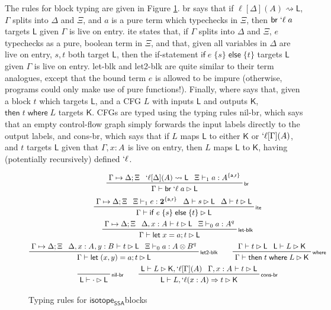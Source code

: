 \documentclass[acmsmall,screen,review]{acmart}
\newcommand{\mb}[1]{\ensuremath{\mathbf{#1}}}
\newcommand{\ms}[1]{\ensuremath{\mathsf{#1}}}
\newcommand{\lbl}[1]{{`#1}}
\newcommand{\lto}{\Rightarrow}
\newcommand{\letstmt}[3]{\ensuremath{\ms{let}\;#1 = #2; #3}}
\newcommand{\brb}[2]{\ms{br}\;#1\;#2}
\newcommand{\lbrb}[2]{\brb{\lbl{#1}}{#2}}
\newcommand{\ite}[3]{\ms{if}\;#1\;\{#2\}\;\ms{else}\;\{#3\}}
\newcommand{\ewhere}[2]{\ms{then}\;#1\;\ms{where}\;#2}
\newcommand{\wbranch}[3]{#1(#2) \lto #3}
\newcommand{\lwbranch}[3]{\wbranch{\lbl{#1}}{#2}{#3}}
\newcommand{\csplits}[3]{#1 \mapsto #2;#3}
\newcommand{\lwk}[2]{#1 \rightsquigarrow #2}
\newcommand{\thyp}[3]{#1: {#2}^{#3}}
\newcommand{\lhyp}[3]{#1[#2](#3)}
\newcommand{\llhyp}[3]{\lhyp{\lbl{#1}}{#2}{#3}}
\newcommand{\rle}[1]{{\scriptsize\textsf{#1}}}
\newcommand{\tint}{{\{\ms{a}, \ms{r}\}}}
\newcommand{\hasty}[5]{#1 \vdash_{#2} #3: {#4}^{#5}}
\newcommand{\haslb}[3]{#1 \vdash #2 \rhd #3}
\newcommand{\lhaslb}[3]{#1 \vdash #2 \rhd #3}
\newcommand{\isotopessa}{\ms{isotope_{SSA}}}
\begin{document}
The rules for block typing are given in Figure \ref{fig:ssa-block-typing}.
\rle{br} says that if \(\lwk{\lhyp{\ell}{\Delta}{A}}{\ms{L}}\), \(\Gamma\)
splits into \(\Delta\) and \(\Xi\), and \(a\) is a pure term which typechecks in
\(\Xi\), then \(\lbrb{\ell}{a}\) targets \(\ms{L}\) given \(\Gamma\) is live on
entry. \rle{ite} states that, if \(\Gamma\) splits into \(\Delta\) and \(\Xi\),
\(e\) typechecks as a pure, boolean term in \(\Xi\), and that, given all
variables in \(\Delta\) are live on entry, \(s, t\) both target \(\ms{L}\), then
the if-statement \(\ite{e}{s}{t}\) targets \(\ms{L}\) given \(\Gamma\) is live
on entry. \rle{let-blk} and \rle{let2-blk} are quite similar to their term
analogues, except that the bound term \(e\) is allowed to be impure (otherwise,
programs could only make use of pure functions!). Finally, \rle{where} says
that, given a block \(t\) which targets \(\ms{L}\), and a CFG \(L\) with inputs
\(\ms{L}\) and outputs \(\ms{K}\), \(\ewhere{t}{L}\) targets \(\ms{K}\). CFGs
are typed using the typing rules \rle{nil-br}, which says that an empty
control-flow graph simply forwards the input labels directly to the output
labels, and \rle{cons-br}, which says that if \(L\) maps \(\ms{L}\) to either
\(\ms{K}\) or \(\lbl{\ell}[\Gamma](A)\), and \(t\) targets \(\ms{L}\) given that
\(\Gamma, \thyp{x}{A}{}\) is live on entry, then \(L\) maps \(\ms{L}\) to
\(\ms{K}\), having (potentially recursively) defined \(\lbl{\ell}\).

\begin{figure}
  \begin{gather*}    
    \prftree[r]{\rle{br}}
      {\csplits{\Gamma}{\Delta}{\Xi}}
      {\lwk{\llhyp{\ell}{\Delta}{A}}{\ms{L}}}
      {\hasty{\Xi}{1}{a}{A}{\tint}}
      {\haslb{\Gamma}{\lbrb{\ell}{a}}{\ms{L}}} 
    \\
    \prftree[r]{\rle{ite}}
      {\csplits{\Gamma}{\Delta}{\Xi}}
      {\hasty{\Xi}{1}{e}{\mb{2}}{\tint}}
      {\haslb{\Delta}{s}{\ms{L}}}
      {\haslb{\Delta}{t}{\ms{L}}}
      {\haslb{\Gamma}{\ite{e}{s}{t}}{\ms{L}}} 
    \\
    \prftree[r]{\rle{let-blk}}
      {\csplits{\Gamma}{\Delta}{\Xi}}
      {\haslb{\Delta, \thyp{x}{A}{}}{t}{\ms{L}}}
      {\hasty{\Xi}{0}{a}{A}{q}}
      {\haslb{\Gamma}{\letstmt{x}{a}{t}}{\ms{L}}} 
    \\
    \prftree[r]{\rle{let2-blk}}
      {\csplits{\Gamma}{\Delta}{\Xi}}
      {\haslb{\Delta, \thyp{x}{A}{}, \thyp{y}{B}{}}{t}{\ms{L}}}
      {\hasty{\Xi}{0}{a}{A \otimes B}{q}}
      {\haslb{\Gamma}{\letstmt{(x, y)}{a}{t}}{\ms{L}}} \qquad
    \prftree[r]{\rle{where}}
      {\haslb{\Gamma}{t}{\ms{L}}}
      {\lhaslb{\ms{L}}{L}{\ms{K}}}
      {\haslb{\Gamma}{\ewhere{t}{L}}{\ms{K}}}
    \\
    \prftree[r]{\rle{nil-br}}
      {\lhaslb{\ms{L}}{\cdot}{\ms{L}}} \qquad
    \prftree[r]{\rle{cons-br}}
      {\lhaslb{\ms{L}}{L}{\ms{K}, \llhyp{\ell}{\Gamma}{A}}}
      {\haslb{\Gamma, \thyp{x}{A}{}}{t}{\ms{L}}}
      {\lhaslb{\ms{L}}{L, \lwbranch{\ell}{x: A}{t}}{\ms{K}}}
  \end{gather*}
  \caption{Typing rules for \isotopessa blocks}
  \label{fig:ssa-block-typing}
\end{figure}
\end{document}
